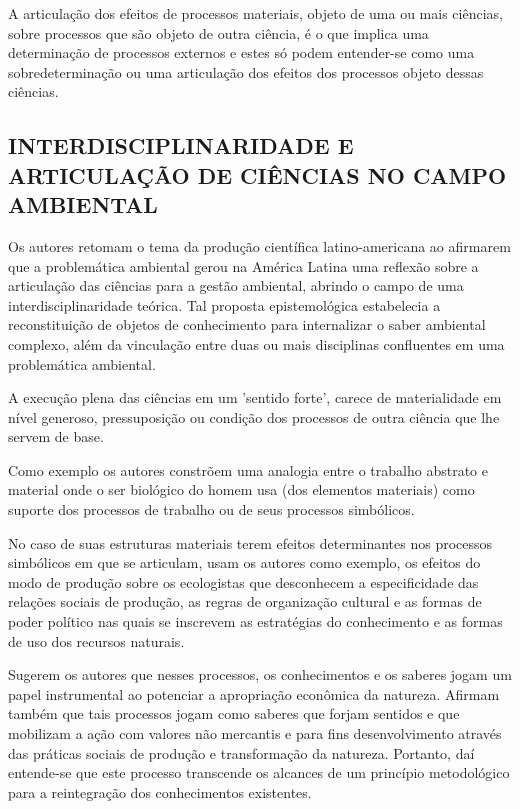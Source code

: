 \documentclass[
   article,       %
   12pt,          %
   oneside,       %
   a4paper,       %
   english,       %
   brazil,           %
   sumario=tradicional
   ]{abntex2}
\begin{document}
A articulação dos efeitos de processos materiais, objeto de uma ou mais ciências, sobre processos que são objeto de outra ciência, é o que implica uma determinação de processos externos e estes só podem entender-se como uma sobredeterminação ou uma articulação dos efeitos dos processos objeto dessas ciências.


\subsection{INTERDISCIPLINARIDADE E ARTICULAÇÃO DE CIÊNCIAS NO
CAMPO AMBIENTAL}


Os autores retomam o tema da produção científica latino-americana ao afirmarem que a problemática ambiental gerou na América Latina uma reflexão sobre a articulação das ciências para a gestão ambiental, abrindo o campo de uma interdisciplinaridade teórica. Tal proposta epistemológica estabelecia a reconstituição de objetos de conhecimento para internalizar o saber ambiental complexo, além da vinculação entre duas ou mais disciplinas confluentes em uma problemática ambiental. 

A execução plena das ciências em um 'sentido forte', carece de materialidade em nível generoso, pressuposição ou condição dos processos de outra ciência que lhe servem de base. 

Como exemplo os autores constrõem uma analogia entre o trabalho abstrato e material onde o ser biológico do homem usa (dos elementos materiais) como suporte dos processos de trabalho ou de seus processos simbólicos.

No caso de suas estruturas materiais terem efeitos determinantes nos processos simbólicos em que se articulam, usam os autores como exemplo, os efeitos do modo de produção sobre os ecologistas que desconhecem a especificidade das relações sociais de produção, as regras de organização cultural e as formas de poder político nas quais se inscrevem as estratégias do conhecimento e as formas de uso dos recursos naturais. 

Sugerem os autores que nesses processos, os conhecimentos e os saberes jogam um papel instrumental ao potenciar a apropriação econômica da natureza. Afirmam também que tais processos jogam como saberes que forjam sentidos e que mobilizam a ação com valores não mercantis e para fins desenvolvimento através das práticas sociais de produção e transformação da natureza. Portanto, daí entende-se que este processo transcende os alcances de um princípio metodológico para a reintegração dos conhecimentos existentes. 
\end{document}
